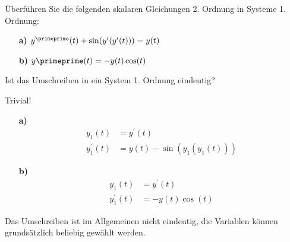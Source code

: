 \begin{exercise}

Überführen Sie die folgenden skalaren Gleichungen 2. Ordnung in Systeme 1. Ordnung:

\begin{itemize}

  \item[\textbf{a)}] $y^\primeprime(t) + \sin(y^\prime(y^\prime(t))) = y(t)$

  \item[\textbf{b)}] $y\primeprime(t) = -y(t) \cos(t)$

\end{itemize}

Ist das Umschreiben in ein System 1. Ordnung eindeutig?

\end{exercise}

\begin{solution}

Trivial!

\begin{itemize}

  \item[\textbf{a)}]
      \begin{align*}
      y_1(t) & = y^\prime(t) \\
      y_1^\prime(t) & = y(t) - \sin(y_1(y_1(t)))
      \end{align*}

  \item[\textbf{b)}]
      \begin{align*}
      y_1(t) & = y^\prime(t) \\
      y_1^\prime(t) & = -y(t)\cos(t)
      \end{align*}
\end{itemize}
Das Umschreiben ist im Allgemeinen nicht eindeutig, die Variablen können grundsätzlich beliebig
gewählt werden.
\end{solution}
